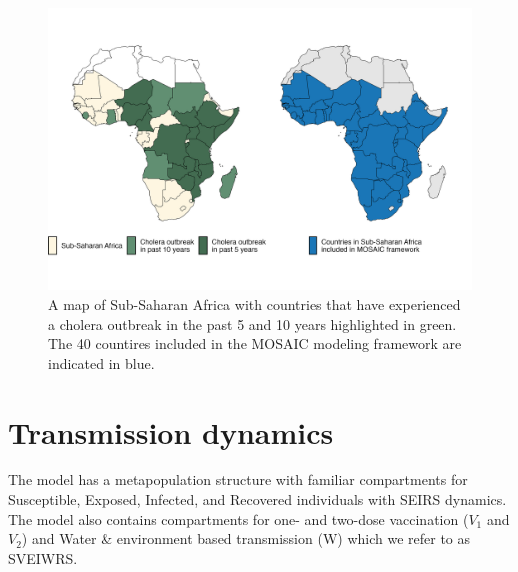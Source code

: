 \documentclass[
]{book}
\begin{document}
\begin{figure}

{\centering \includegraphics[width=1\linewidth]{figures/africa_map} 

}

\caption{A map of Sub-Saharan Africa with countries that have experienced a cholera outbreak in the past 5 and 10 years highlighted in green. The 40 countires included in the MOSAIC modeling framework are indicated in blue.}\label{fig:map}
\end{figure}

\section{Transmission dynamics}\label{transmission-dynamics}

The model has a metapopulation structure with familiar compartments for Susceptible, Exposed, Infected, and Recovered individuals with SEIRS dynamics. The model also contains compartments for one- and two-dose vaccination (\(V_1\) and \(V_2\)) and Water \& environment based transmission (W) which we refer to as SVEIWRS.
\end{document}
